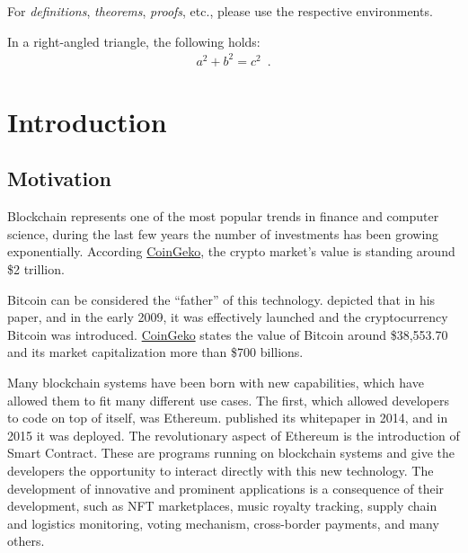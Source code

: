 For \emph{definitions}, \emph{theorems}, \emph{proofs}, etc., please use
the respective environments.

\begin{theorem}
  In a right-angled triangle, the following holds:
  \begin{align*}
    a^{2}+b^{2}=c^{2}\enspace.
  \end{align*}

\end{theorem}


\chapter{Introduction}
\label{ch:Introduction}


\section{Motivation}
\label{sec:Introduction:Motivation}

Blockchain represents one of the most popular trends in finance and computer science, 
during the last few years the number of investments has been growing exponentially. 
According \href{https://www.coingecko.com/}{CoinGeko}, the crypto market's value is standing around \$2 trillion.

Bitcoin can be considered the “father” of this technology. \citet{Bitcoin} depicted that in his paper, and in the early 2009,
it was effectively launched and the cryptocurrency Bitcoin was introduced. 
\href{https://www.coingecko.com/}{CoinGeko} states the value of Bitcoin around \$38,553.70 and its market capitalization more than  \$700 billions.

Many blockchain systems have been born with new capabilities, 
which have allowed them to fit many different use cases. The first, which allowed developers to 
code on top of itself, was Ethereum.
\citet{Ethereum} published its whitepaper in 2014, and in 2015 it was deployed.
The revolutionary aspect of Ethereum is the introduction of Smart Contract.
These are programs running on blockchain systems and give the developers the opportunity to interact directly 
with this new technology. 
The development of innovative and prominent applications is a consequence of their development, such as NFT marketplaces, music royalty tracking, supply chain and logistics monitoring, voting mechanism, 
cross-border payments, and many others.  

